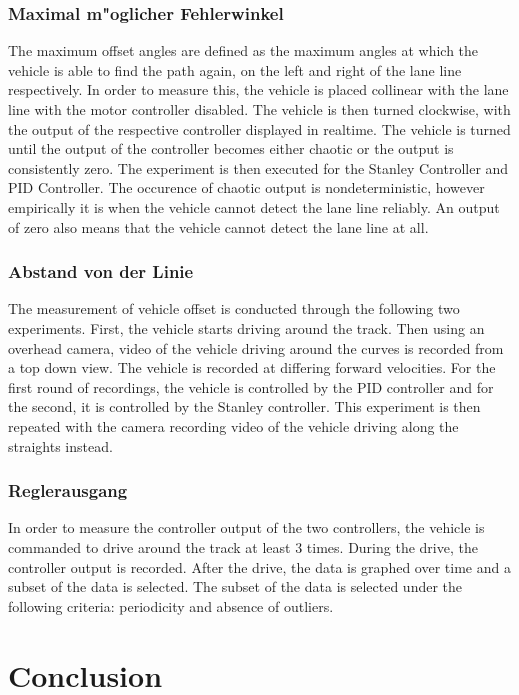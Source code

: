 \documentclass[arbeit=studie,oneside,BCOR=12mm]{ArbeitRST}
\begin{document}
\subsection{Maximal m"oglicher Fehlerwinkel}
The maximum offset angles are defined as the maximum angles at which the
vehicle is able to find the path again, on the left and right of the lane line
respectively. In order to measure this, the vehicle is placed collinear with
the lane line with the motor controller disabled. The vehicle is then turned
clockwise, with the output of the respective controller displayed in realtime.
The vehicle is turned until the output of the controller becomes either chaotic
or the output is consistently zero. The experiment is then executed for the
Stanley Controller and PID Controller. The occurence of chaotic output is
nondeterministic, however empirically it is when the vehicle cannot detect the
lane line reliably. An output of zero also means that the vehicle cannot detect
the lane line at all.

\subsection{Abstand von der Linie}
The measurement of vehicle offset is conducted through the following two
experiments. First, the vehicle starts driving around the track. Then using an
overhead camera, video of the vehicle driving around the curves is recorded
from a top down view. The vehicle is recorded at differing forward velocities.
For the first round of recordings, the vehicle is controlled by the PID
controller and for the second, it is controlled by the Stanley controller. This
experiment is then repeated with the camera recording video of the vehicle
driving along the straights instead. 

\subsection{Reglerausgang}
In order to measure the controller output of the two controllers, the vehicle
is commanded to drive around the track at least 3 times. During the drive, the
controller output is recorded. After the drive, the data is graphed over time
and a subset of the data is selected. The subset of the data is selected under
the following criteria: periodicity and absence of outliers.


\chapter{Conclusion}
\end{document}

